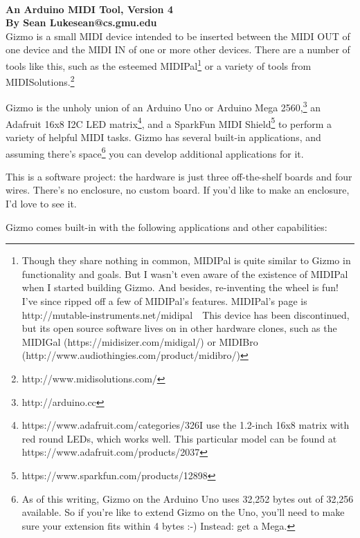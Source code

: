 \documentclass{article}
\begin{document}
\\[0.5em]
{\large \bf An Arduino MIDI Tool, Version 4\\
By Sean Luke\quad sean@cs.gmu.edu} 
\\


\noindent Gizmo is a small MIDI device intended to be inserted between the MIDI OUT of one device and the MIDI IN of one or more other devices.  There are a number of tools like this, such as the esteemed MIDIPal\footnote{Though they share nothing in common, MIDIPal is quite similar to Gizmo in functionality and goals.  But I wasn't even aware of the existence of MIDIPal when I started building Gizmo.  And besides, re-inventing the wheel is fun!  I've since ripped off a few of MIDIPal's features.  MIDIPal's page is http:/\!/mutable-instruments.net/midipal\ \ This device has been discontinued, but its open source software lives on in other hardware clones, such as the MIDIGal (https:/\!/midisizer.com/midigal/) or MIDIBro (http:/\!/www.audiothingies.com/product/midibro/)} or a variety of tools from MIDISolutions.\footnote{http:/\!/www.midisolutions.com/}

Gizmo is the unholy union of an Arduino Uno or Arduino Mega 2560,\footnote{http:/\!/arduino.cc} an Adafruit 16x8 I2C LED matrix\footnote{https:/\!/www.adafruit.com/categories/326\quad I use the 1.2-inch 16x8 matrix with red round LEDs, which works well.  This particular model can be found at https:/\!/www.adafruit.com/products/2037}, and a SparkFun MIDI Shield\footnote{https:/\!/www.sparkfun.com/products/12898} to perform a variety of helpful MIDI tasks.  Gizmo has several built-in applications, and assuming there's space\footnote{As of this writing, Gizmo on the Arduino Uno uses 32,252 bytes out of 32,256 available.  So if you're like to extend Gizmo on the Uno, you'll need to make sure your extension fits within 4 bytes :-)  Instead: get a Mega.} you can develop additional applications for it.

This is a software project: the hardware is just three off-the-shelf boards and four wires.  There's no enclosure, no custom board.  If you'd like to make an enclosure, I'd love to see it.

Gizmo comes built-in with the following applications and other capabilities:
\end{document}
